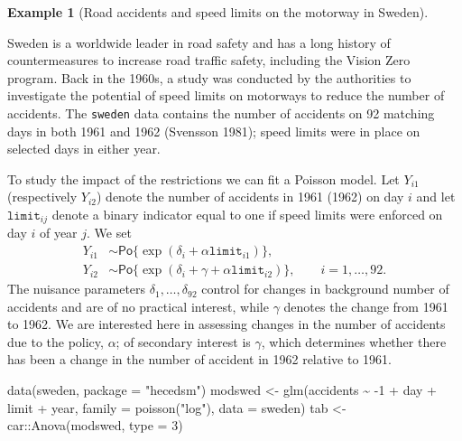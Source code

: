 \documentclass[
  11pt,
  letterpaper,
]{scrbook}
\newenvironment{Shaded}{\begin{snugshade}}{\end{snugshade}}
\newcommand{\AttributeTok}[1]{\textcolor[rgb]{0.40,0.45,0.13}{#1}}
\newcommand{\DecValTok}[1]{\textcolor[rgb]{0.68,0.00,0.00}{#1}}
\newcommand{\FunctionTok}[1]{\textcolor[rgb]{0.28,0.35,0.67}{#1}}
\newcommand{\NormalTok}[1]{\textcolor[rgb]{0.00,0.23,0.31}{#1}}
\newcommand{\OtherTok}[1]{\textcolor[rgb]{0.00,0.23,0.31}{#1}}
\newcommand{\SpecialCharTok}[1]{\textcolor[rgb]{0.37,0.37,0.37}{#1}}
\newcommand{\StringTok}[1]{\textcolor[rgb]{0.13,0.47,0.30}{#1}}
\theoremstyle{definition}
\newtheorem{example}{Example}[chapter]
\theoremstyle{definition}
\theoremstyle{remark}
\begin{document}
\begin{example}[Road accidents and speed limits on the motorway in
Sweden]\protect\hypertarget{exm-roadsweden}{}\label{exm-roadsweden}

Sweden is a worldwide leader in road safety and has a long history of
countermeasures to increase road traffic safety, including the Vision
Zero program. Back in the 1960s, a study was conducted by the
authorities to investigate the potential of speed limits on motorways to
reduce the number of accidents. The \texttt{sweden} data contains the
number of accidents on 92 matching days in both 1961 and 1962 (Svensson
1981); speed limits were in place on selected days in either year.

To study the impact of the restrictions we can fit a Poisson model. Let
\(Y_{i1}\) (respectively \(Y_{i2}\)) denote the number of accidents in
1961 (1962) on day \(i\) and let \(\texttt{limit}_{ij}\) denote a binary
indicator equal to one if speed limits were enforced on day \(i\) of
year \(j\). We set \begin{align*}
Y_{i1} &\sim \mathsf{Po}\{\exp(\delta_i + \alpha \texttt{limit}_{i1})\},
\\ Y_{i2} &\sim\mathsf{Po}\{\exp(\delta_i + \gamma +  \alpha \texttt{limit}_{i2})\}, \qquad i=1, \ldots, 92.
\end{align*} The nuisance parameters \(\delta_1, \ldots, \delta_{92}\)
control for changes in background number of accidents and are of no
practical interest, while \(\gamma\) denotes the change from 1961 to
1962. We are interested here in assessing changes in the number of
accidents due to the policy, \(\alpha\); of secondary interest is
\(\gamma\), which determines whether there has been a change in the
number of accident in 1962 relative to 1961.

\begin{Shaded}
\begin{Highlighting}[]
\FunctionTok{data}\NormalTok{(sweden, }\AttributeTok{package =} \StringTok{"hecedsm"}\NormalTok{)}
\NormalTok{modswed }\OtherTok{\textless{}{-}} \FunctionTok{glm}\NormalTok{(accidents }\SpecialCharTok{\textasciitilde{}} \SpecialCharTok{{-}}\DecValTok{1} \SpecialCharTok{+}\NormalTok{ day }\SpecialCharTok{+}\NormalTok{ limit }\SpecialCharTok{+}\NormalTok{ year,}
               \AttributeTok{family =} \FunctionTok{poisson}\NormalTok{(}\StringTok{"log"}\NormalTok{), }
               \AttributeTok{data =}\NormalTok{ sweden)}
\NormalTok{tab }\OtherTok{\textless{}{-}}\NormalTok{ car}\SpecialCharTok{::}\FunctionTok{Anova}\NormalTok{(modswed, }\AttributeTok{type =} \DecValTok{3}\NormalTok{)}
\end{Highlighting}
\end{Shaded}


\end{example}
\end{document}
